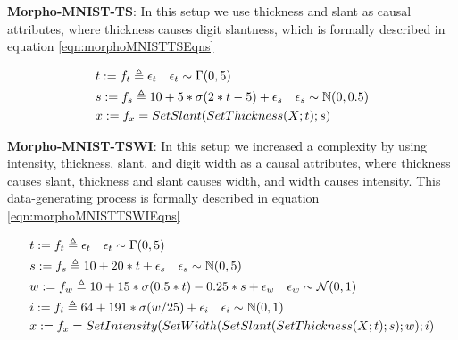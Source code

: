 \documentclass{article}
\begin{document}
\textbf{Morpho-MNIST-TS}: In this setup we use thickness and slant as causal attributes, where thickness causes digit slantness, which is formally described in equation \ref{eqn:morphoMNISTTSEqns}

\begin{equation}
    \begin{aligned}
        &t := f_t \triangleq \epsilon_t \quad \epsilon_t \sim \Gamma(0, 5) \\
        &s := f_s \triangleq 10 + 5*\sigma(2*t - 5) + \epsilon_s \quad \epsilon_s \sim \mathbb{N}(0, 0.5)\\
        &x := f_x = SetSlant(SetThickness(X; t); s)
    \end{aligned}
    \label{eqn:morphoMNISTTSEqns}
    \centering
\end{equation}

\textbf{Morpho-MNIST-TSWI}: In this setup we increased a complexity by using intensity, thickness, slant, and digit width as a causal attributes, where thickness causes slant, thickness and slant causes width, and width causes intensity.
This data-generating process is formally described in equation \ref{eqn:morphoMNISTTSWIEqns}

\begin{equation}
    \begin{aligned}
        &t := f_t \triangleq \epsilon_t \quad \epsilon_t \sim \Gamma(0, 5) \\
        &s := f_s \triangleq 10 + 20*t + \epsilon_s \quad \epsilon_s \sim \mathbb{N}(0, 5)\\
        &w := f_w \triangleq  10 + 15*\sigma(0.5*t) - 0.25*s  + \epsilon_w \quad \epsilon_w \sim \mathcal{N}(0, 1) \\
        &i := f_i \triangleq 64 + 191*\sigma(w/25) + \epsilon_i \quad \epsilon_i \sim \mathbb{N}(0, 1)\\
        &x := f_x = SetIntensity(SetWidth(SetSlant(SetThickness(X; t); s); w); i)
    \end{aligned}
    \label{eqn:morphoMNISTTSWIEqns}
    \centering
\end{equation}

\end{document}
